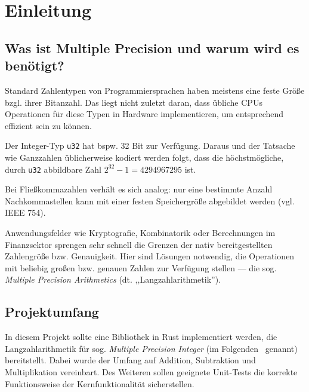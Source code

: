 \section{Einleitung}

    \subsection{Was ist Multiple Precision und warum wird es benötigt?}
        Standard Zahlentypen von Programmiersprachen haben meistens eine feste Größe bzgl. ihrer Bitanzahl. Das liegt nicht zuletzt daran, dass übliche CPUs Operationen für diese Typen in Hardware implementieren, um entsprechend effizient sein zu können.

        Der Integer-Typ \texttt{u32} hat bspw. 32 Bit zur Verfügung. Daraus und der Tatsache wie Ganzzahlen üblicherweise kodiert werden folgt, dass die höchstmögliche, durch \texttt{u32} abbildbare Zahl \(2^{32}-1=\num{4294967295}\) ist.

        Bei Fließkommazahlen verhält es sich analog: nur eine bestimmte Anzahl Nachkommastellen kann mit einer festen Speichergröße abgebildet werden (vgl. IEEE 754).

        Anwendungsfelder wie Kryptografie, Kombinatorik oder Berechnungen im Finanzsektor sprengen sehr schnell die Grenzen der nativ bereitgestellten Zahlengröße bzw. Genauigkeit. Hier sind Lösungen notwendig, die Operationen mit beliebig großen bzw. genauen Zahlen zur Verfügung stellen --- die sog. \emph{Multiple Precision Arithmetics} (dt. ,,Langzahlarithmetik'').

        \subsection{Projektumfang}
        In diesem Projekt sollte eine Bibliothek in Rust implementiert werden, die Langzahlarithmetik für sog. \emph{Multiple Precision Integer} (im Folgenden \mpi\ genannt) bereitstellt.
        Dabei wurde der Umfang auf Addition, Subtraktion und Multiplikation vereinbart.
        Des Weiteren sollen geeignete Unit-Tests die korrekte Funktionsweise der Kernfunktionalität sicherstellen.
